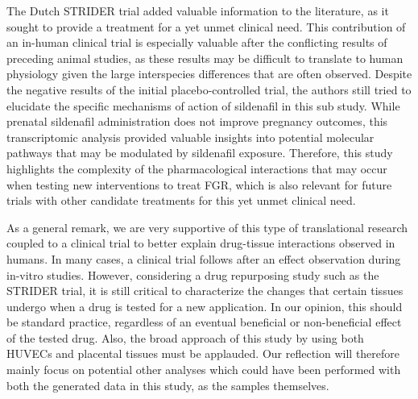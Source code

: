 \documentclass[authordate, reflection]{jote-new-article}
\begin{document}
	The Dutch STRIDER trial added valuable information to the literature, as it sought to provide a treatment for a yet unmet clinical need. This contribution of an in-human clinical trial is especially valuable after the conflicting results of preceding animal studies, as these results may be difficult to translate to human physiology given the large interspecies differences that are often observed. Despite the negative results of the initial placebo-controlled trial, the authors still tried to elucidate the specific mechanisms of action of sildenafil in this sub study. While prenatal sildenafil administration does not improve pregnancy outcomes, this transcriptomic analysis provided valuable insights into potential molecular pathways that may be modulated by sildenafil exposure. Therefore, this study highlights the complexity of the pharmacological interactions that may occur when testing new interventions to treat FGR, which is also relevant for future trials with other candidate treatments for this yet unmet clinical need.



	As a general remark, we are very supportive of this type of translational research coupled to a clinical trial to better explain drug-tissue interactions observed in humans. In many cases, a clinical trial follows after an effect observation during in-vitro studies. However, considering a drug repurposing study such as the STRIDER trial, it is still critical to characterize the changes that certain tissues undergo when a drug is tested for a new application. In our opinion, this should be standard practice, regardless of an eventual beneficial or non-beneficial effect of the tested drug. Also, the broad approach of this study by using both HUVECs and placental tissues must be applauded. Our reflection will therefore mainly focus on potential other analyses which could have been performed with both the generated data in this study, as the samples themselves.
\end{document}
